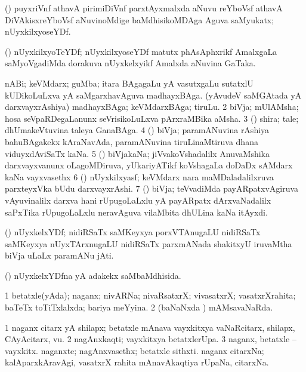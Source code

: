 \bentry
{}
\gl{\nA}
\bmng
(\jiVra) puyxriVnf athavA pirimiDiVnf parxtAyxmalxda aNuvu reYboVsf athavA DiVAkisxreYboVsf aNuvinoMdige baMdhisikoMDAga Aguva saMyukatx; nUyxkilxyoseYDf. 
\emng
\eentry

\bentry
{}
\gl{\nA}
\bmng
(\jiVra) nUyxkilxyoTeYDf; nUyxkilxyoseYDf matutx phAsAphxrikf AmalxgaLa saMyoVgadiMda dorakuva nUyxkelxyikf Amalxda aNuvina GaTaka. 
\emng
\eentry

\bentry
{}
\gl{\nA}
\bmng
\bnum
{} 
\banum
{} nABi; keVMdarx; guMba; itara BAgagaLu yA vasutxgaLu sutatxlU kUDikoLuLxva yA saMgarxhavAguva madhayxBAga. 
 (yAvudeV saMGAtada yA darxvayxrAshiya) madhayxBAga; keVMdarxBAga; tiruLu. 
\eanum
\numie
\num{2} biVja; mUlAMsha; hosa seVpaRDegaLanunx seVrisikoLuLxva pArxraMBika aMsha. 
\num{3} (\Kavi) shira; tale; dhUmakeVtuvina taleya GanaBAga. 
\num{4} (\Bwvi) biVja; paramANuvina rAshiya bahuBAgakekx kAraNavAda, paramANuvina tiruLinaMtiruva dhana viduyxdAviSaTx kaNa. 
\num{5} (\jiVvi) biVjakaNa; jiVvakoVshadalilx AnuvaMshika darxvayxvanunx oLagoMDiruva, yUkariyATikf koVshagaLa doDaDx sAMdarx kaNa vayxvasethx  
\num{6} (\aMrashA) nUyxkilxyasf; keVMdarx nara maMDaladalilxruva parxteyxVka bUdu darxvayxrAshi. 
\num{7} (\Bwvi) biVja; teVvadiMda payARpatxvAgiruva vAyuvinalilx darxva hani rUpugoLaLxlu yA payARpatx dArxvaNadalilx saPxTika rUpugoLaLxlu neravAguva vilaMbita dhULina kaNa itAyxdi. 
\enum
\emng
\eentry

\bentry
{}
\gl{\nA}
\bmng
(\Bwvi) nUyxkelxYDf; nidiRSaTx saMKeyxya porxVTAnugaLU nidiRSaTx saMKeyxya nUyxTArxnugaLU nidiRSaTx parxmANada shakitxyU iruvaMtha biVja uLaLx paramANu jAti. 
\emng
\eentry

\bentry
{}
\gl{\gu}
\bmng
(\Bwvi) nUyxkelxYDfna yA adakekx saMbaMdhisida. 
\emng
\eentry

\bentry
{}
\gl{\gu}
\bmng
\bnum
\num{1} betatxle(yAda); naganx; nivARNa; nivaRsatxrX; vivasatxrX; vasatxrXrahita; baTeTx toTiTxlalxda; bariya meYyina. 
\num{2} (baNaNxda \vi) mAMsavaNaRda. 
\enum
\emng
\eentry

\bentry
{}
\gl{\nA}
\bmng
\bnum
\num{1} naganx citarx yA shilapx; betatxle mAnava vayxkitxya vaNaRcitarx, shilapx, CAyAcitarx, \mo vu. 
\num{2} nagAnxkaqti; vayxkitxya betatxlerUpa. 
\num{3} naganx, betatxle -- vayxkitx. 
\hypertarget{nude(2)4}{} 
\banum
{} naganxte; nagAnxvasethx; betatxle sithxti. 
 naganx citarxNa; kalAparxkAravAgi, vasatxrX rahita mAnavAkaqtiya rUpaNa, citarxNa. 
\eanum
\numie
\enum
\emng

